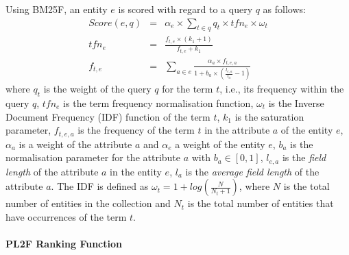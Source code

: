 Using BM25F, an entity $e$ is scored with regard to a query $q$ as follows:
\begin{eqnarray}
  Score(e,q) & = & \alpha_e\times\sum_{t\in q}{q_t\times tfn_e \times \omega_t}\\
  \label{eq:tfidf-score}
  tfn_e & = & \frac{f_{t,e}\times(k_1+1)}{f_{t,e}+k_1} \\
  \label{eq:bm25f_2}
  f_{t,e} & = &
  \sum_{a\in e}{\frac{\alpha_a\times f_{t,e,a}}{1+b_a\times\left(\frac{l_{e,a}}{l_a}-1\right)}}
  \label{eq:bm25f_1}
\end{eqnarray}
where $q_t$ is the weight of the query $q$ for the term $t$, i.e., its frequency within the query $q$, $tfn_e$ is the term frequency normalisation function, $\omega_t$ is the Inverse Document Frequency (IDF) function of the term $t$, $k_1$ is the saturation parameter, $f_{t,e,a}$ is the frequency of the term $t$ in the attribute $a$ of the entity $e$, $\alpha_a$ is a weight of the attribute $a$ and $\alpha_e$ a weight of the entity $e$, $b_a$ is the normalisation parameter for the attribute $a$ with $b_a \in \left[0,1\right]$, $l_{e,a}$ is the \emph{field length} of the attribute $a$ in the entity $e$, $l_a$ is the \emph{average field length} of the attribute $a$. The IDF is defined as
$
\omega_t=1+log\left(\frac{N}{N_t+1}\right)
$,
where $N$ is the total number of entities in the collection and $N_t$ is the total number of entities that have occurrences of the term $t$.

\paragraph{PL2F Ranking Function}

